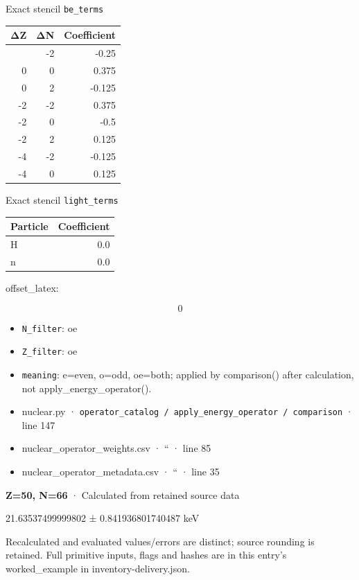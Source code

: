 \documentclass[
  11pt,
  letterpaper,
]{article}
\begin{document}
Exact stencil \texttt{be\_terms}

\begin{longtable}[]{@{}rrr@{}}
\toprule\noalign{}
ΔZ & ΔN & Coefficient \\
\midrule\noalign{}
\endhead
\bottomrule\noalign{}
\endlastfoot
0 & -2 & -0.25 \\
0 & 0 & 0.375 \\
0 & 2 & -0.125 \\
-2 & -2 & 0.375 \\
-2 & 0 & -0.5 \\
-2 & 2 & 0.125 \\
-4 & -2 & -0.125 \\
-4 & 0 & 0.125 \\
\end{longtable}

Exact stencil \texttt{light\_terms}

\begin{longtable}[]{@{}lr@{}}
\toprule\noalign{}
Particle & Coefficient \\
\midrule\noalign{}
\endhead
\bottomrule\noalign{}
\endlastfoot
H & 0.0 \\
n & 0.0 \\
\end{longtable}

offset\_latex:

\[
0
\]

\begin{itemize}
\item
  \texttt{N\_filter}: oe
\item
  \texttt{Z\_filter}: oe
\item
  \texttt{meaning}: e=even, o=odd, oe=both; applied by comparison()
  after calculation, not apply\_energy\_operator().
\item
  nuclear.py ·
  \texttt{operator\_catalog\ /\ apply\_energy\_operator\ /\ comparison}
  · line 147
\item
  nuclear\_operator\_weights.csv · `` · line 85
\item
  nuclear\_operator\_metadata.csv · `` · line 35
\end{itemize}

\textbf{Z=50, N=66} · Calculated from retained source data

21.63537499999802 ± 0.841936801740487 keV

Recalculated and evaluated values/errors are distinct; source rounding
is retained. Full primitive inputs, flags and hashes are in this entry's
worked\_example in inventory-delivery.json.
\end{document}
